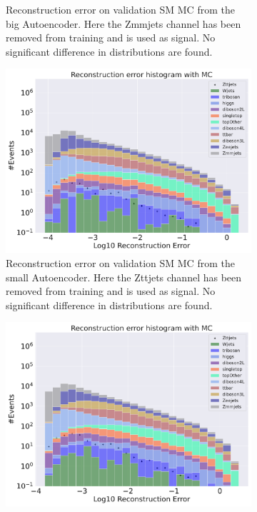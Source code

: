 \begin{figure}[h!]
\begin{subfigure}{.45\textwidth}
        \caption{Reconstruction error on validation SM MC from the big Autoencoder. Here the Zmmjets channel has been removed from training and 
        is used as signal. No significant difference in distributions are found. }
        \label{fig:ae_big_Zmmjets}
    \end{subfigure}
    \hfill
    \begin{subfigure}{.45\textwidth}
        \includegraphics[width=\textwidth]{Figures/AE_testing/small/b_data_recon_big_rm3_feats_sig_Zttjets.pdf}
        \caption{Reconstruction error on validation SM MC from the small Autoencoder. Here the Zttjets channel has been removed from training and 
        is used as signal. No significant difference in distributions are found. }
        \label{fig:ae_small_Zttjets}
    \end{subfigure}
    \hfill 
    \begin{subfigure}{.45\textwidth}
        \includegraphics[width=\textwidth]{Figures/AE_testing/big/b_data_recon_big_rm3_feats_sig_Zttjets.pdf}

\end{subfigure}
\end{figure}

